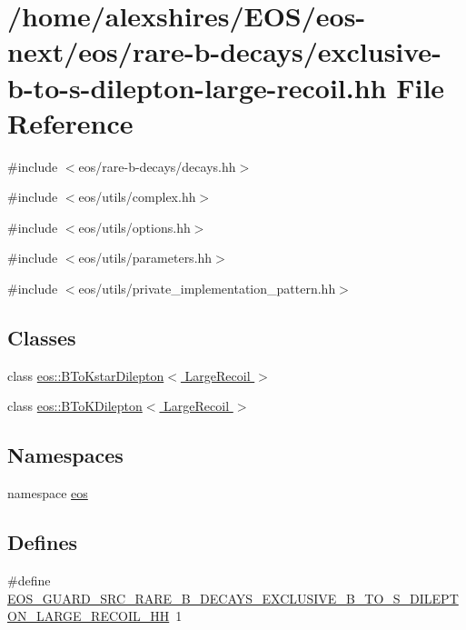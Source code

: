 \hypertarget{exclusive-b-to-s-dilepton-large-recoil_8hh}{
\section{/home/alexshires/EOS/eos-\/next/eos/rare-\/b-\/decays/exclusive-\/b-\/to-\/s-\/dilepton-\/large-\/recoil.hh File Reference}
\label{exclusive-b-to-s-dilepton-large-recoil_8hh}
}
{\ttfamily \#include $<$eos/rare-\/b-\/decays/decays.hh$>$}\par
{\ttfamily \#include $<$eos/utils/complex.hh$>$}\par
{\ttfamily \#include $<$eos/utils/options.hh$>$}\par
{\ttfamily \#include $<$eos/utils/parameters.hh$>$}\par
{\ttfamily \#include $<$eos/utils/private\_\-implementation\_\-pattern.hh$>$}\par
\subsection*{Classes}
\begin{DoxyCompactItemize}
\item 
class \hyperlink{classeos_1_1BToKstarDilepton_3_01LargeRecoil_01_4}{eos::BToKstarDilepton$<$ LargeRecoil $>$}
\item 
class \hyperlink{classeos_1_1BToKDilepton_3_01LargeRecoil_01_4}{eos::BToKDilepton$<$ LargeRecoil $>$}
\end{DoxyCompactItemize}
\subsection*{Namespaces}
\begin{DoxyCompactItemize}
\item 
namespace \hyperlink{namespaceeos}{eos}
\end{DoxyCompactItemize}
\subsection*{Defines}
\begin{DoxyCompactItemize}
\item 
\#define \hyperlink{exclusive-b-to-s-dilepton-large-recoil_8hh_afae717ab235166a0482b75bcb9a1b3ea}{EOS\_\-GUARD\_\-SRC\_\-RARE\_\-B\_\-DECAYS\_\-EXCLUSIVE\_\-B\_\-TO\_\-S\_\-DILEPTON\_\-LARGE\_\-RECOIL\_\-HH}~1
\end{DoxyCompactItemize}


